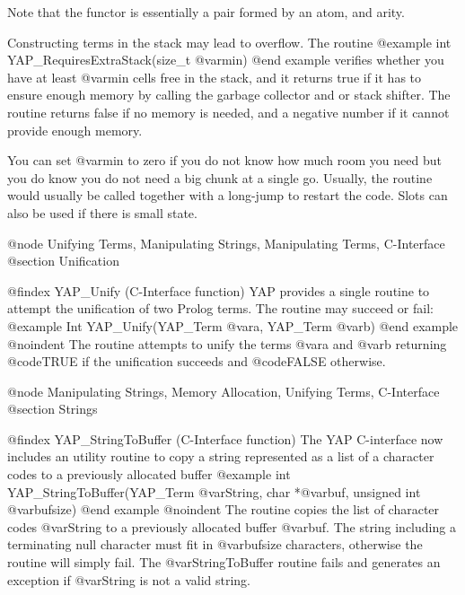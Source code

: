 {{{{{{{{Note that the functor is essentially a pair formed by an atom, and
arity.

Constructing terms in the stack may lead to overflow. The routine
@example
      int          YAP_RequiresExtraStack(size_t @var{min})
@end example
verifies whether you have at least @var{min} cells free in the stack,
and it returns true if it has to ensure enough memory by calling the
garbage collector and or stack shifter. The routine returns false if no
memory is needed, and a negative number if it cannot provide enough
memory.

You can set @var{min} to zero if you do not know how much room you need
but you do know you do not need a big chunk at a single go. Usually, the routine
would usually be called together with a long-jump to restart the
code. Slots can also be used if there is small state.

@node Unifying Terms, Manipulating Strings, Manipulating Terms, C-Interface
@section Unification

@findex YAP_Unify (C-Interface function)
YAP provides a single routine to attempt the unification of two Prolog
terms. The routine may succeed or fail:
@example
      Int      YAP_Unify(YAP_Term @var{a}, YAP_Term @var{b})
@end example
@noindent
The routine attempts to unify the terms @var{a} and
@var{b} returning @code{TRUE} if the unification succeeds and @code{FALSE}
otherwise.

@node Manipulating Strings, Memory Allocation, Unifying Terms, C-Interface
@section Strings

@findex YAP_StringToBuffer (C-Interface function)
The YAP C-interface now includes an utility routine to copy a string
represented as a list of a character codes to a previously allocated buffer
@example
      int YAP_StringToBuffer(YAP_Term @var{String}, char *@var{buf}, unsigned int @var{bufsize})
@end example
@noindent
The routine copies the list of character codes @var{String} to a
previously allocated buffer @var{buf}. The string including a
terminating null character must fit in @var{bufsize} characters,
otherwise the routine will simply fail. The @var{StringToBuffer} routine
fails and generates an exception if @var{String} is not a valid string.

}}}}}}}}

